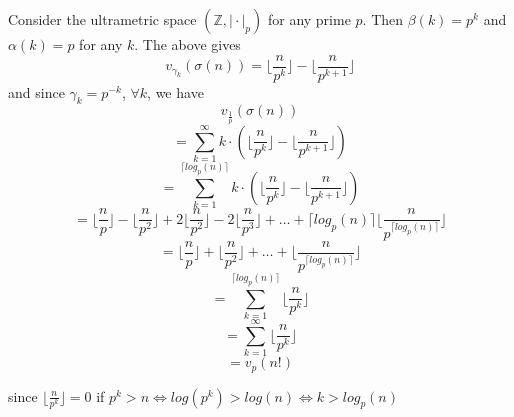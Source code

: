 \begin{example}
Consider the ultrametric space $(\mathbb{Z}, \rvert \cdot \lvert_p)$  for any prime $p$. Then $\beta(k)=p^k$ and $\alpha(k)=p$ for any $k$. The above gives 
\[v_{\gamma_k}(\sigma(n)) =\lfloor \frac{n}{p^{k}}\rfloor - \lfloor \frac{n}{p^{k+1}} \rfloor\]
and since $\gamma_k = p^{-k}$, $\forall k$, we have 
\[v_{\frac{1}{p}}(\sigma(n)) \]
\[ = \sum_{k=1}^{\infty} k \cdot (\lfloor \frac{n}{p^{k}}\rfloor - \lfloor \frac{n}{p^{k+1}} \rfloor) \]
\[ = \sum_{k=1}^{\lceil log_p(n) \rceil}  k \cdot (\lfloor \frac{n}{p^{k}}\rfloor - \lfloor \frac{n}{p^{k+1}} \rfloor)\]
\[ = \lfloor \frac{n}{p}\rfloor - \lfloor \frac{n}{p^{2}} \rfloor +  2\lfloor \frac{n}{p^2}\rfloor - 2\lfloor \frac{n}{p^3} \rfloor + \ldots +  \lceil log_p(n)\rceil \lfloor \frac{n}{p^{ \lceil log_p(n)\rceil}} \rfloor \]
\[ = \lfloor \frac{n}{p}\rfloor + \lfloor \frac{n}{p^2}\rfloor  + \ldots +  \lfloor \frac{n}{p^{ \lceil log_p(n)\rceil}} \rfloor \]
\[ =  \sum_{k=1}^{\lceil log_p(n) \rceil} \lfloor \frac{n}{p^{k}}\rfloor \]
\[ =  \sum_{k=1}^{\infty} \lfloor \frac{n}{p^{k}}\rfloor \]
\[= v_{p}(n!) \]

since $\lfloor \frac{n}{p^k} \rfloor = 0$ if $ p^k > n \iff log(p^k) > log(n) \iff k > log_p(n)$
\end{example}




